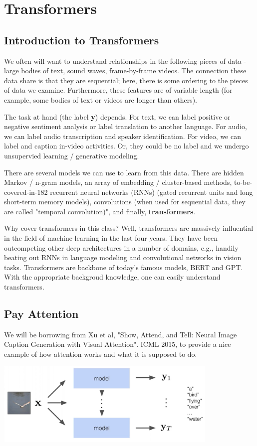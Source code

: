 \documentclass[10pt,a4paper]{book}
\begin{document}
\chapter{Transformers}
\section{Introduction to Transformers}
We often will want to understand relationships in the following pieces of data - large bodies of text, sound waves, frame-by-frame videos. The connection these data share is that they are sequential; here, there is some ordering to the pieces of data we examine. Furthermore, these features are of variable length (for example, some bodies of text or videos are longer than others).

The task at hand (the label \textbf{y}) depends. For text, we can label positive or negative sentiment analysis or label translation to another language. For audio, we can label audio transcription and speaker identification. For video, we can label and caption in-video activities. Or, they could be no label and we undergo unsupervied learning / generative modeling. 

There are several models we can use to learn from this data. There are hidden Markov / n-gram models, an array of embedding / cluster-based methods, to-be-covered-in-182 recurrent neural networks (RNNs) (gated recurrent units and long short-term memory models), convolutions (when used for sequential data, they are called "temporal convolution)", and finally, \textbf{transformers}.

Why cover transformers in this class? Well, transformers are massively influential in the field of machine learning in the last four years. They have been outcompeting other deep architectures in a number of domains, e.g., handily beating out RNNs in language modeling and convolutional networks in vision tasks. Transformers are backbone of today's famous models, BERT and GPT. With the appropriate backgroud knowledge, one can easily understand transformers.
\section{Pay Attention}
We will be borrowing from Xu et al, "Show, Attend, and Tell: Neural Image Caption Generation with Visual Attention". ICML 2015, to provide a nice example of how attention works and what it is supposed to do.

\includegraphics[width=0.8\textwidth]{images/SequentialGeneration.png}
\end{document}

